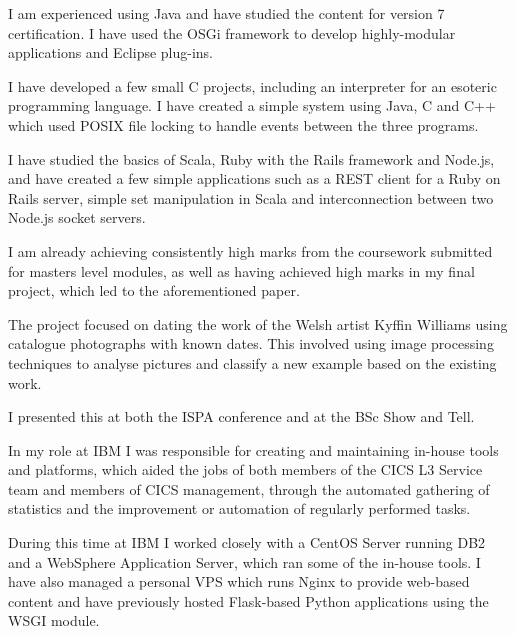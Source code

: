 \documentclass[10pt,stdletter,dateno,sigleft]{newlfm} %
\begin{document}
\begin{newlfm}
I am experienced using Java and have studied the content for version 7 
certification. I have used the OSGi framework to develop highly-modular
applications and Eclipse plug-ins.

I have developed a few small C projects, including an interpreter for an 
esoteric programming language. I have created a simple system using Java, C and
C++ which used POSIX file locking to handle events between the three programs.

I have studied the basics of Scala, Ruby with the Rails framework and Node.js,
and have created a few simple applications such as a REST client for a Ruby on
Rails server, simple set manipulation in Scala and interconnection between two
Node.js socket servers.

I am already achieving consistently high marks from the coursework submitted 
for masters level modules, as well as having achieved high marks in my final
project, which led to the aforementioned paper.

The project focused on dating the work of the Welsh artist Kyffin Williams 
using catalogue photographs with known dates. This involved using image 
processing techniques to analyse pictures and classify a new example based
on the existing work.

I presented this at both the ISPA conference and at the BSc Show and Tell.

In my role at IBM I was responsible for creating and maintaining in-house tools and 
platforms, which aided the jobs of both members of the CICS L3 Service team and members
of CICS management, through the automated gathering of statistics and the 
improvement or automation of regularly performed tasks.

During this time at IBM I worked closely with a CentOS Server running DB2 and a WebSphere 
Application Server, which ran some of the in-house tools. I have also managed a
personal VPS which runs Nginx to provide web-based content and have previously
hosted Flask-based Python applications using the WSGI module.


\end{newlfm}
\end{document}
